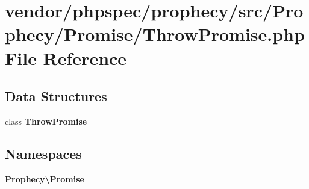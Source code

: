 \section{vendor/phpspec/prophecy/src/\+Prophecy/\+Promise/\+Throw\+Promise.php File Reference}
\label{_throw_promise_8php}
\subsection*{Data Structures}
\begin{DoxyCompactItemize}
\item 
class {\bf Throw\+Promise}
\end{DoxyCompactItemize}
\subsection*{Namespaces}
\begin{DoxyCompactItemize}
\item 
 {\bf Prophecy\textbackslash{}\+Promise}
\end{DoxyCompactItemize}
